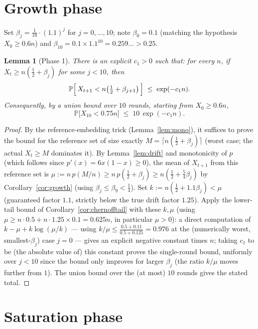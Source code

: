 \documentclass[11pt]{article}
\newtheorem{lemma}[theorem]{Lemma}
\renewcommand{\Pr}{\mathbb{P}}
\begin{document}
\section{Growth phase}\label{sec:growth}

Set $\beta_j = \tfrac1{10}\cdot(1.1)^j$ for $j=0,\dots,10$; note $\beta_0 =
0.1$ (matching the hypothesis $X_0 \ge 0.6n$) and $\beta_{10} = 0.1 \times
1.1^{10} = 0.259\ldots > 0.25$.

\begin{lemma}[Phase 1]\label{lem:phase1}
There is an explicit $c_1>0$ such that: for every $n$, if $X_t \ge n(\tfrac12
+ \beta_j)$ for some $j<10$, then
\[
  \Pr\Bigl[\, X_{t+1} < n\bigl(\tfrac12+\beta_{j+1}\bigr) \,\Bigr] \;\le\;
  \exp(-c_1 n).
\]
Consequently, by a union bound over $10$ rounds, starting from $X_0 \ge
0.6n$,
\[
  \Pr\bigl[X_{10} < 0.75n\bigr] \;\le\; 10\,\exp(-c_1 n).
\]
\end{lemma}
\begin{proof}
By the reference-embedding trick (Lemma~\ref{lem:mono}), it suffices to
prove the bound for the reference set of size exactly $M = \lceil
n(\tfrac12+\beta_j)\rceil$ (worst case; the actual $X_t \ge M$ dominates it).
By Lemma~\ref{lem:drift} and monotonicity of $p$ (which follows since
$p'(x)=6x(1-x)\ge0$), the mean of $X_{t+1}$ from this reference set is
$\mu := n\,p(M/n) \ge n\,p(\tfrac12+\beta_j) \ge n(\tfrac12+\tfrac54\beta_j)$
by Corollary~\ref{cor:growth} (using $\beta_j \le \beta_9 < \tfrac14$). Set
$k := n(\tfrac12+1.1\beta_j) < \mu$ (guaranteed factor $1.1$, strictly below
the true drift factor $1.25$). Apply the lower-tail bound of
Corollary~\ref{cor:chernofftail} with these $k,\mu$ (using $\mu \ge n\cdot
0.5+n\cdot 1.25\times0.1 = 0.625n$, in particular $\mu>0$): a direct
computation of $k-\mu+k\log(\mu/k)$ — using $k/\mu \le \frac{0.5+0.11}{0.5+0.125}
= 0.976$ at the (numerically worst, smallest-$\beta_j$) case $j=0$ — gives
an explicit negative constant times $n$; taking $c_1$ to be (the absolute
value of) this constant proves the single-round bound, uniformly over
$j<10$ since the bound only improves for larger $\beta_j$ (the ratio $k/\mu$
moves further from $1$). The union bound over the (at most) $10$ rounds
gives the stated total.
\end{proof}

\section{Saturation phase}\label{sec:saturation}
\end{document}
